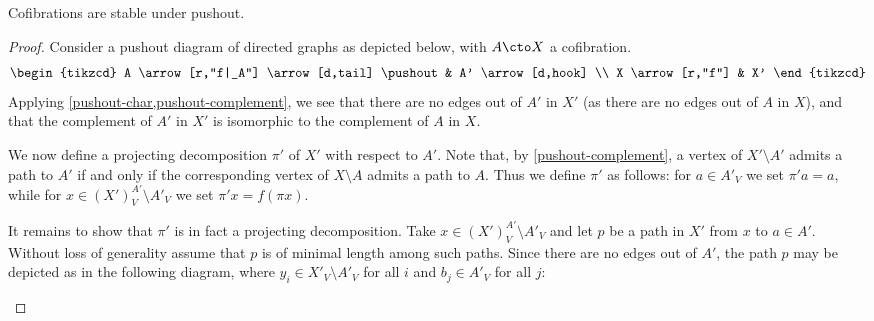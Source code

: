 \begin{proposition}\label{cof-pushout}
Cofibrations are stable under pushout.
\end{proposition}

\begin{proof}
Consider a pushout diagram of directed graphs as depicted below, with $A \cto X$ a cofibration.
\[
\begin{tikzcd}
A \arrow[r,"f|_A"] \arrow[d,tail] \pushout & A' \arrow[d,hook] \\
X \arrow[r,"f"] & X'
\end{tikzcd}
\]
Applying \cref{pushout-char,pushout-complement}, we see that there are no edges out of $A'$ in $X'$ (as there are no edges out of $A$ in $X$), and that the complement of $A'$ in $X'$ is isomorphic to the complement of $A$ in $X$.

We now define a projecting decomposition $\pi'$ of $X'$ with respect to $A'$. Note that, by \cref{pushout-complement}, a vertex of $X' \setminus A'$ admits a path to $A'$ if and only if the corresponding vertex of $X \setminus A$ admits a path to $A$. Thus we define $\pi'$ as follows: for $a \in A'_V$ we set $\pi' a = a$, while for $x \in (X')^{A'}_V \setminus A'_V$ we set $\pi' x = f(\pi x)$.

It remains to show that $\pi'$ is in fact a projecting decomposition. Take $x \in (X')_V^{A'}\setminus A'_V$ and let $p$ be a path in $X'$ from $x$ to $a \in A'$. Without loss of generality assume that $p$ is of minimal length among such paths. Since there are no edges out of $A'$, the path $p$ may be depicted as in the following diagram, where $y_i \in X'_V \setminus A'_V$ for all $i$ and $b_j \in A'_V$ for all $j$:

\begin{figure}[H]
    \centering
\end{figure}


\end{proof}
